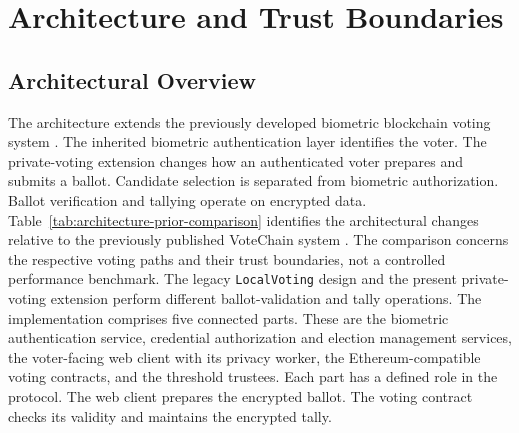 \section{Architecture and Trust Boundaries}
\label{sec:04}
\label{sec:architecture}

\subsection{Architectural Overview}
\label{subsec:architecture-overview}

The architecture extends the previously developed biometric blockchain
voting system \citep{rifat2026biometric}. The inherited biometric
authentication layer identifies the voter. The private-voting extension
changes how an authenticated voter prepares and submits a ballot. Candidate
selection is separated from biometric authorization. Ballot verification
and tallying operate on encrypted data.
Table~\ref{tab:architecture-prior-comparison} identifies the architectural
changes relative to the previously published VoteChain system
\citep{rifat2026biometric}. The comparison concerns the respective voting
paths and their trust boundaries, not a controlled performance benchmark.
The legacy \texttt{LocalVoting} design and the present private-voting
extension perform different ballot-validation and tally operations.
The implementation comprises five connected parts. These are the biometric
authentication service, credential authorization and election management
services, the voter-facing web client with its privacy worker, the
Ethereum-compatible voting contracts, and the threshold trustees. Each part
has a defined role in the protocol. The web client prepares the encrypted
ballot. The voting contract checks its validity and maintains the encrypted
tally.


